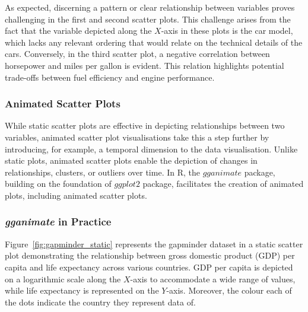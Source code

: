 \documentclass{article}\usepackage[]{graphicx}\usepackage[]{xcolor}
\numberwithin{equation}{section}
\begin{document}
\noindent As expected, discerning a pattern or clear relationship between variables proves challenging in the first and second scatter plots. This challenge arises from the fact that the variable depicted along the $X$-axis in these plots is the car model, which lacks any relevant ordering that would relate on the technical details of the cars. Conversely, in the third scatter plot, a negative correlation between horsepower and miles per gallon is evident. This relation highlights potential trade-offs between fuel efficiency and engine performance. 

\subsubsection{Animated Scatter Plots}
\noindent While static scatter plots are effective in depicting relationships between two variables, animated scatter plot visualisations take this a step further by introducing, for example, a temporal dimension to the data visualisation. Unlike static plots, animated scatter plots enable the depiction of changes in relationships, clusters, or outliers over time. In R, the $gganimate$ package, building on the foundation of $ggplot2$ package, facilitates the creation of animated plots, including animated scatter plots. 

\subsubsection{\textit{gganimate} in Practice}

\noindent Figure~\ref{fig:gapminder_static} represents the gapminder dataset in a static scatter plot demonstrating the relationship between gross domestic product (GDP) per capita and life expectancy across various countries. GDP per capita is depicted on a logarithmic scale along the $X$-axis to accommodate a wide range of values, while life expectancy is represented on the $Y$-axis. Moreover, the colour each of the dots indicate the country they represent data of.\\
\end{document}
